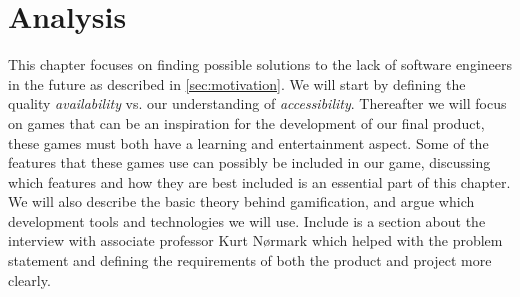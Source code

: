 \chapter{Analysis}
\label{cha:analysis}

This chapter focuses on finding possible solutions to the lack of software engineers in the future as described in \autoref{sec:motivation}. We will start by defining the quality \textit{availability} vs. our understanding of \textit{accessibility}. Thereafter we will focus on games that can be an inspiration for the development of our final product, these games must both have a learning and entertainment aspect. Some of the features that these games use can possibly be included in our game, discussing which features and how they are best included is an essential part of this chapter. We will also describe the basic theory behind gamification, and argue which development tools and technologies we will use. Include is a section about the interview with associate professor Kurt N{\o}rmark which helped with the problem statement and defining the requirements of both the product and project more clearly.\newpage

%

%











